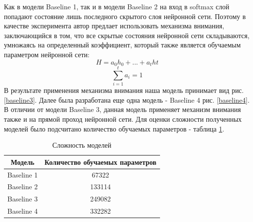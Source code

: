     Как в модели Baseline 1, так и в модели Baseline 2 на вход в softmax слой попадают состояние лишь последного скрытого слоя нейронной сети. Поэтому в качестве эксперимента автор предлает использовать механизма внимания, заключающийся в том, что все скрытые состояния нейронной сети складываются, умножаясь на определенный коэффициент, который также является обучаемым параметром нейронной сети:
    \begin{equation}\label{attention}
    H = a_{0}h_{0}+...+a_{t}h{t}
    \end{equation}
    \begin{equation}\label{coeff}
    \sum_{i=1}^{t} a_{i}=1
    \end{equation}
    В результате применения механизма внимания наша модель принимает вид рис. \ref{baseline3}.
    Далее была разработана еще одна модель - Baseline 4 рис. \ref{baseline4}. В отличии от модели Baseline 3, данная модель применяет механизм внимания также и на прямой проход нейронной сети.
    Для оценки сложности полученных моделей было подсчитано количество обучаемых параметров - таблица \ref{hard}.
    \begin{table}[ht]
    \centering
    \caption{Сложность моделей}\label{hard}
    \begin{tabular}{@{}cc@{}}
    \toprule
    Модель         & Количество обучаемых параметров \\ \midrule
    Baseline 1 & 67322     \\
    Baseline 2 & 133114      \\
    Baseline 3 & 249082    \\
    Baseline 4 & 332282   \\ \bottomrule
    \end{tabular}
    \end{table}

